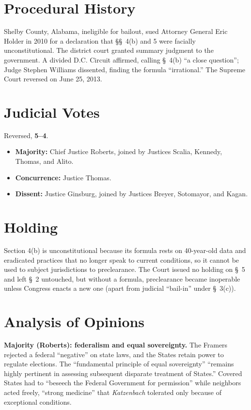 \documentclass[12pt]{article}
\begin{document}
\section{Procedural History}

Shelby County, Alabama, ineligible for bailout, sued Attorney General Eric Holder in 2010 for a declaration that \S\S~4(b) and 5 were facially unconstitutional. The district court granted summary judgment to the government. A divided D.C. Circuit affirmed, calling \S~4(b) ``a close question''; Judge Stephen Williams dissented, finding the formula ``irrational.'' The Supreme Court reversed on June 25, 2013.

\section{Judicial Votes}

Reversed, \textbf{5--4}.
\begin{itemize}
\item \textbf{Majority:} Chief Justice Roberts, joined by Justices Scalia, Kennedy, Thomas, and Alito.
\item \textbf{Concurrence:} Justice Thomas.
\item \textbf{Dissent:} Justice Ginsburg, joined by Justices Breyer, Sotomayor, and Kagan.
\end{itemize}

\section{Holding}

Section 4(b) is unconstitutional because its formula rests on 40-year-old data and eradicated practices that no longer speak to current conditions, so it cannot be used to subject jurisdictions to preclearance. The Court issued no holding on \S~5 and left \S~2 untouched, but without a formula, preclearance became inoperable unless Congress enacts a new one (apart from judicial ``bail-in'' under \S~3(c)).

\section{Analysis of Opinions}

\textbf{Majority (Roberts): federalism and equal sovereignty.} The Framers rejected a federal ``negative'' on state laws, and the States retain power to regulate elections. The ``fundamental principle of equal sovereignty'' ``remains highly pertinent in assessing subsequent disparate treatment of States.'' Covered States had to ``beseech the Federal Government for permission'' while neighbors acted freely, ``strong medicine'' that \textit{Katzenbach} tolerated only because of exceptional conditions.
\end{document}
